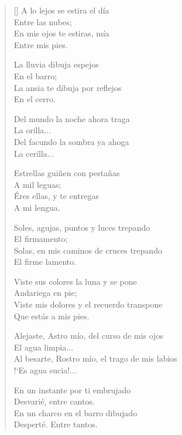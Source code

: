 \documentclass[a4paper,11pt]{article}
\begin{document}
\thispagestyle{empty}


\settowidth{\versewidth}{Al besarte, Rostro mío, el trago de mis labios}

\bigskip

\begin{verse}[\versewidth]
A lo lejos se estira el día \\
\qquad Entre las nubes; \\
En mis ojos te estiras, mía \\
\qquad Entre mis pies.

La lluvia dibuja espejos \\
\qquad En el barro; \\
La ansia te dibuja por reflejos \\
\qquad En el cerro.

Del mundo la noche ahora traga \\
\qquad La orilla... \\
Del facundo la sombra ya ahoga \\
\qquad La cerilla...

Estrellas guiñen con pestañas \\
\qquad A mil leguas; \\
Éres ellas, y te entregas \\
\qquad A mi lengua.

Soles, agujas, puntos y luces trepando \\
\qquad El firmamento; \\
Solas, en mis caminos de cruces trepando \\
\qquad El firme lamento.

Viste sus colores la luna y se pone \\
\qquad Andariega en pie; \\
Viste mis dolores y el recuerdo transpone \\
\qquad Que estás a mis pies.

Alejaste, Astro mío, del curso de mis ojos \\
\qquad El agua limpia... \\
Al besarte, Rostro mío, el trago de mis labios \\
\qquad !`Es agua sucia!...

En un instante por ti embrujado \\
\qquad Desvarié, entre cantos. \\
En un charco en el barro dibujado \\
\qquad Desperté. Entre tantos.
\end{verse}
\end{document}
